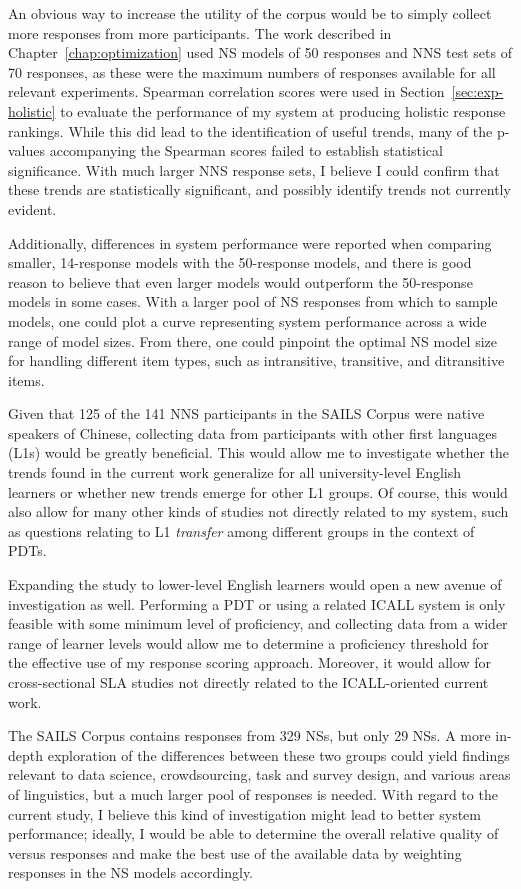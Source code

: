 An obvious way to increase the utility of the corpus would be to simply collect more responses from more participants. The work described in Chapter~\ref{chap:optimization} used NS models of 50 responses and NNS test sets of 70 responses, as these were the maximum numbers of responses available for all relevant experiments. Spearman correlation scores were used in Section~\ref{sec:exp-holistic} to evaluate the performance of my system at producing holistic response rankings. While this did lead to the identification of useful trends, many of the p-values accompanying the Spearman scores failed to establish statistical significance. With much larger NNS response sets, I believe I could confirm that these trends are statistically significant, and possibly identify trends not currently evident.

Additionally, differences in system performance were reported when comparing smaller, 14-response models with the 50-response models, and there is good reason to believe that even larger models would outperform the 50-response models in some cases. With a larger pool of NS responses from which to sample models, one could plot a curve representing system performance across a wide range of model sizes. From there, one could pinpoint the optimal NS model size for handling different item types, such as intransitive, transitive, and ditransitive items.

Given that 125 of the 141 NNS participants in the SAILS Corpus were native speakers of Chinese, collecting data from participants with other first languages (L1s) would be greatly beneficial. This would allow me to investigate whether the trends found in the current work generalize for all university-level English learners or whether new trends emerge for other L1 groups. Of course, this would also allow for many other kinds of studies not directly related to my system, such as questions relating to L1 \textit{transfer} among different groups in the context of PDTs.

Expanding the study to lower-level English learners would open a new avenue of investigation as well. Performing a PDT or using a related ICALL system is only feasible with some minimum level of proficiency, and collecting data from a wider range of learner levels would allow me to determine a proficiency threshold for the effective use of my response scoring approach. Moreover, it would allow for cross-sectional SLA studies not directly related to the ICALL-oriented current work.

The SAILS Corpus contains responses from 329  NSs, but only 29  NSs. A more in-depth exploration of the differences between these two groups could yield findings relevant to data science, crowdsourcing, task and survey design, and various areas of linguistics, but a much larger pool of  responses is needed. With regard to the current study, I believe this kind of investigation might lead to better system performance; ideally, I would be able to determine the overall relative quality of  versus  responses and make the best use of the available data by weighting responses in the NS models accordingly.

